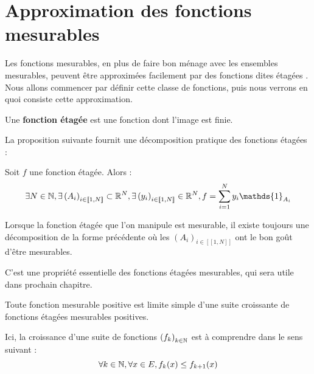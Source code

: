 \documentclass[../integ-proba.tex]{subfiles}
\begin{document}

  \section{Approximation des fonctions mesurables}

  Les fonctions mesurables, en plus de faire bon ménage avec les ensembles mesurables, peuvent être approximées facilement par des fonctions dites \og étagées \fg.
  Nous allons commencer par définir cette classe de fonctions, puis nous verrons en quoi consiste cette approximation.

  \begin{defi}
    Une \textbf{fonction étagée} est une fonction dont l'image est finie.
  \end{defi}

  La proposition suivante fournit une décomposition pratique des fonctions étagées :

  \begin{prop}
    Soit $f$ une fonction étagée.
    Alors :
    \begin{displaymath}
      \exists N \in \N, \exists \left(A_i\right)_{i \in [\![1,N]\!]} \subset \R^N, \exists \left(y_i\right)_{i \in [\![1,N]\!]} \in \R^N, f = \sum_{i=1}^{N}y_i\mathds{1}_{A_i}
    \end{displaymath}
  \end{prop}

  \begin{rem}
    Lorsque la fonction étagée que l'on manipule est mesurable, il existe toujours une décomposition de la forme précédente où les $\left(A_i\right)_{i\in[\![1,N]\!]}$ ont le bon goût d'être mesurables.

    C'est une propriété essentielle des fonctions étagées mesurables, qui sera utile dans prochain chapitre.
  \end{rem}

  \begin{thm}
    \label{thm:decompmes}
    Toute fonction mesurable positive est limite simple d'une suite croissante de fonctions étagées mesurables positives.
  \end{thm}

  \begin{rem}
    Ici, la croissance d'une suite de fonctions $\left(f_k\right)_{k\in \mathbb{N}}$ est à comprendre dans le sens suivant :
    \begin{displaymath}
      \forall k \in \mathbb{N}, \forall x \in E, f_k(x) \leq f_{k+1}(x)
    \end{displaymath}
  \end{rem}
\end{document}

